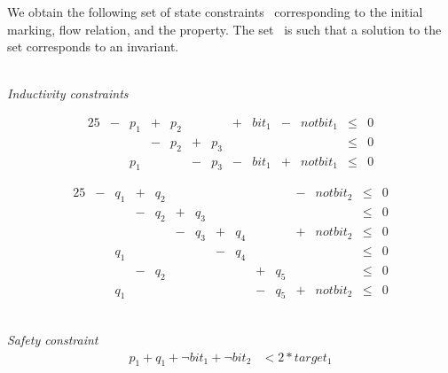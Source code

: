 We obtain the following set of state constraints \setCp\ corresponding
to the initial marking, flow relation, and the property.
The set \setCp\ is such that a solution to the set corresponds to an
invariant.
\\ \mbox{ } \\
\begin{minipage}{\columnwidth}
  \emph{Inductivity constraints} \\[-2em]
  \begin{minipage}[t]{.49\columnwidth}
    \centering
    \begin{alignat*}{25}
      &{}-{}& p_1 &{}+{}& p_2 &     &     &{}+{}& bit_1 &{}-{}& notbit_1 &{}\le{}& 0 \\[-0.4em]
      &     &     &{}-{}& p_2 &{}+{}& p_3 &     &       &     &          &{}\le{}& 0 \\[-0.4em]
      &     & p_1 &     &     &{}-{}& p_3 &{}-{}& bit_1 &{}+{}& notbit_1 &{}\le{}& 0
    \end{alignat*}
  \end{minipage}
  \begin{minipage}[t]{.49\columnwidth}
    \centering
    \begin{alignat*}{25}
      &{}-{}& q_1 &{}+{}& q_2 &     &     &     &     &     &     &{}-{}& notbit_2 &{}\le{}& 0  \\[-0.4em]
      &     &     &{}-{}& q_2 &{}+{}& q_3 &     &     &     &     &     &          &{}\le{}& 0  \\[-0.4em]
      &     &     &     &     &{}-{}& q_3 &{}+{}& q_4 &     &     &{}+{}& notbit_2 &{}\le{}& 0  \\[-0.4em]
      &     & q_1 &     &     &     &     &{}-{}& q_4 &     &     &     &          &{}\le{}& 0  \\[-0.4em]
      &     &     &{}-{}& q_2 &     &     &     &     &{}+{}& q_5 &     &          &{}\le{}& 0  \\[-0.4em]
      &     & q_1 &     &     &     &     &     &     &{}-{}& q_5 &{}+{}& notbit_2 &{}\le{}& 0 
    \end{alignat*}
  \end{minipage} \\
  \emph{Safety constraint}\\[-2em]
  \begin{align*}
    p_1 + q_1 + \neg bit_1 + \neg bit_2 & < 2 * target_1
  \end{align*}
\end{minipage}
